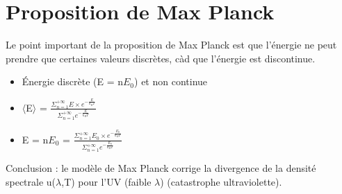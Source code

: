 \documentclass{article}
\begin{document}
\section{Proposition de Max Planck}
Le point important de la proposition de Max Planck est que l'énergie ne peut prendre que certaines valeurs discrètes, càd que l'énergie est discontinue.
\begin{itemize}
    \item Énergie discrète (E = n$E_{0}$) et non continue
    \item $\langle$E$\rangle$ = $\frac{\Sigma_{n=1}^{+\infty} E \times e^{-\frac{E}{k_{B}T}}}{\Sigma_{n=1}^{+\infty} e^{-\frac{E}{k_{B}T}}}$
    \item E = n$E_{0}$ = $\frac{\Sigma_{n=1}^{+\infty} E_{0} \times e^{-\frac{E_{0}}{k_{B}T}}}{\Sigma_{n=1}^{+\infty} e^{-\frac{E_{0}}{k_{B}T}}}$
\end{itemize}
Conclusion : le modèle de Max Planck corrige la divergence de la densité spectrale u($\lambda$,T) pour l'UV (faible $\lambda$) (catastrophe ultraviolette).
\end{document}
